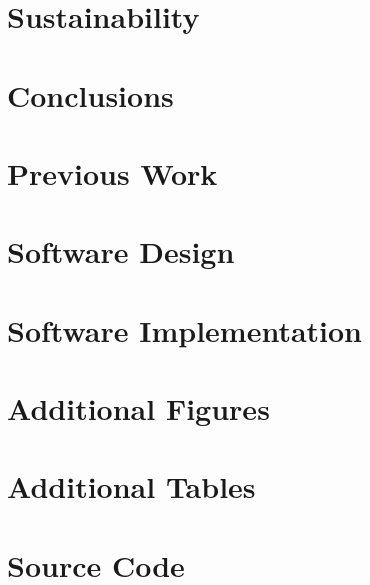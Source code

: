 \documentclass[12pt]{report}
\begin{document}
\chapter{Sustainability}

\chapter{Conclusions}



\titleformat{\chapter}[display]{\normalfont\bfseries\Huge}{}{0pt}{}

\printbibliography[heading=bibintoc,title={Sources of Information}]

\appendix



\chapter{Previous Work}


\titleformat{\chapter}[display]{\normalfont\bfseries\Huge}{}{0pt}{\thechapter{ }{ }}

\chapter{Software Design}

\chapter{Software Implementation}

\titlespacing*{\chapter}{0pt}{-60pt}{0pt}
\chapter{Additional Figures}

\titlespacing*{\chapter}{0pt}{-30pt}{20pt}
\chapter{Additional Tables}

\chapter{Source Code}


\end{document}
